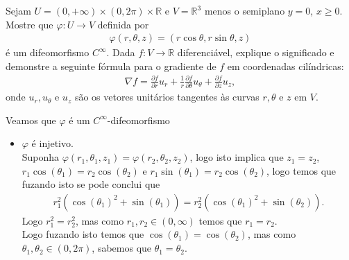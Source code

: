 \begin{homeworkProblem}[Seção 2-7]
  Sejam $U = (0,+\infty)\times (0, 2\pi)\times \mathbb{R}$ e $V = \mathbb{R}^3$ menos o semiplano $y = 0$, $x \geq 0$. Mostre que $\varphi : U \to V$ definida por
    \begin{align*}
    \varphi(r, \theta, z) = (r \cos \theta, r \sin \theta, z)
    \end{align*}
    é um difeomorfismo $C^\infty$. Dada $f : V \to \mathbb{R}$ diferenciável, explique o significado e demonstre a seguinte fórmula para o gradiente de $f$ em coordenadas cilíndricas:
    \begin{align*}
    \nabla f =
    \frac{\partial f}{\partial r} u_r +
    \frac{1}{r}\frac{\partial f}{\partial \theta} u_\theta +
    \frac{\partial f}{\partial z} u_z,
    \end{align*}
    onde $u_r, u_\theta$ e $u_z$ são os vetores unitários tangentes às curvas $r, \theta$ e $z$ em $V$.
  \begin{solution}
    Veamos que $\varphi$ é um $C^{\infty}$-difeomorfismo
    \begin{itemize}
      \item $\varphi$ é injetivo.\\
        Suponha $\varphi(r_1,\theta_1,z_1)=\varphi(r_2,\theta_2,z_2)$, logo isto implica que $z_1=z_2$, $r_1\cos(\theta_1)=r_2\cos(\theta_2)$ e $r_1\sin(\theta_{1})=r_2\cos(\theta_2)$, logo temos que fuzando isto se pode conclui que
        \begin{align*}
          r_1^{2}\left( \cos(\theta_1)^{2}+\sin(\theta_1) \right)=r_2^{2}\left( \cos(\theta_1)^{2}+\sin(\theta_2) \right).
        \end{align*}
        Logo $r_1^{2}=r_2^{2}$, mas como $r_1,r_2\in (0,\infty)$ temos que $r_1=r_2$.\\
        Logo fuzando isto temos que $\cos(\theta_1)=\cos(\theta_2)$, mas como $\theta_1,\theta_2\in (0,2\pi)$, sabemos que $\theta_1=\theta_2$.\\


\end{itemize}
\end{solution}
\end{homeworkProblem}
